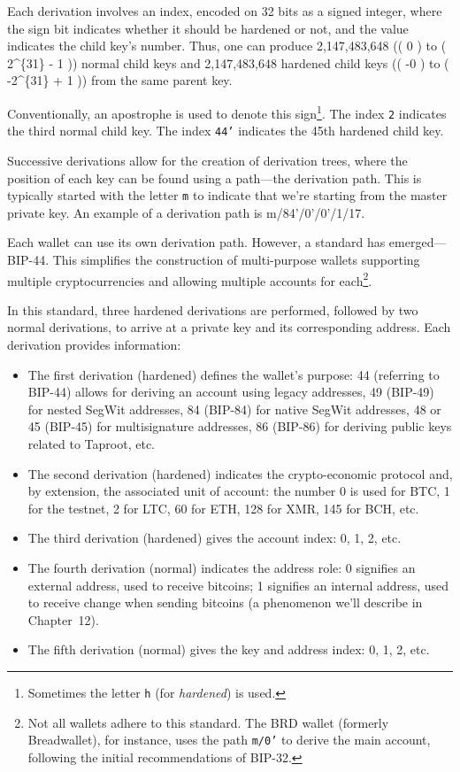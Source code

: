 \documentclass[
  a5paper,
  smalldemyvopaper,10pt,twoside,onecolumn,openright,extrafontsizes,hidelinks]{memoir}
\providecommand{\tightlist}{%
  \setlength{\itemsep}{0pt}\setlength{\parskip}{0pt}}\usepackage{longtable,booktabs,array}
\begin{document}
Each derivation involves an index, encoded on 32 bits as a signed
integer, where the sign bit indicates whether it should be hardened or
not, and the value indicates the child key's number. Thus, one can
produce 2,147,483,648 (( 0 ) to ( 2\^{}\{31\} - 1 )) normal child keys
and 2,147,483,648 hardened child keys (( -0 ) to ( -2\^{}\{31\} + 1 ))
from the same parent key.

Conventionally, an apostrophe is used to denote this sign\footnote{Sometimes
  the letter \texttt{h} (for \emph{hardened}) is used.}. The index
\texttt{2} indicates the third normal child key. The index \texttt{44’}
indicates the 45th hardened child key.

Successive derivations allow for the creation of derivation trees, where
the position of each key can be found using a path---the derivation
path. This is typically started with the letter \texttt{m} to indicate
that we're starting from the master private key. An example of a
derivation path is m/84'/0'/0'/1/17.

Each wallet can use its own derivation path. However, a standard has
emerged---BIP-44. This simplifies the construction of multi-purpose
wallets supporting multiple cryptocurrencies and allowing multiple
accounts for each\footnote{Not all wallets adhere to this standard. The
  BRD wallet (formerly Breadwallet), for instance, uses the path
  \texttt{m/0’} to derive the main account, following the initial
  recommendations of BIP-32.}.

In this standard, three hardened derivations are performed, followed by
two normal derivations, to arrive at a private key and its corresponding
address. Each derivation provides information:

\begin{itemize}
\tightlist
\item
  The first derivation (hardened) defines the wallet's purpose: 44
  (referring to BIP-44) allows for deriving an account using legacy
  addresses, 49 (BIP-49) for nested SegWit addresses, 84 (BIP-84) for
  native SegWit addresses, 48 or 45 (BIP-45) for multisignature
  addresses, 86 (BIP-86) for deriving public keys related to Taproot,
  etc.
\item
  The second derivation (hardened) indicates the crypto-economic
  protocol and, by extension, the associated unit of account: the number
  0 is used for BTC, 1 for the testnet, 2 for LTC, 60 for ETH, 128 for
  XMR, 145 for BCH, etc.
\item
  The third derivation (hardened) gives the account index: 0, 1, 2, etc.
\item
  The fourth derivation (normal) indicates the address role: 0 signifies
  an external address, used to receive bitcoins; 1 signifies an internal
  address, used to receive change when sending bitcoins (a phenomenon
  we'll describe in Chapter~12).
\item
  The fifth derivation (normal) gives the key and address index: 0, 1,
  2, etc.
\end{itemize}
\end{document}
